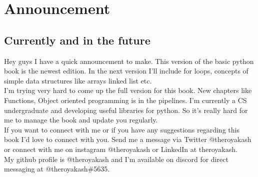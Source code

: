 \chapter{Announcement}
\section{Currently and in the future}
Hey guys I have a quick announcement to make. This version of the basic python book is the newest edition. In the next version I'll include for loops, concepts of simple data structures like arrays linked list etc.\\


\noindent I'm trying very hard to come up the full version for this book. New chapters like Functions, Object oriented programming is in the pipelines. I'm currently a CS undergraduate and developing useful libraries for python. So it's really hard for me to manage the book and update you regularly.\\


\noindent If you want to connect with me or if you have any suggestions regarding this book I'd love to connect with you. Send me a message via Twitter @theroyakash or connect with me on instagram @theroyakash or LinkedIn at theroyakash.\\


\noindent My github profile is @theroyakash and I'm available on discord for direct messaging at @theroyakash\#5635.